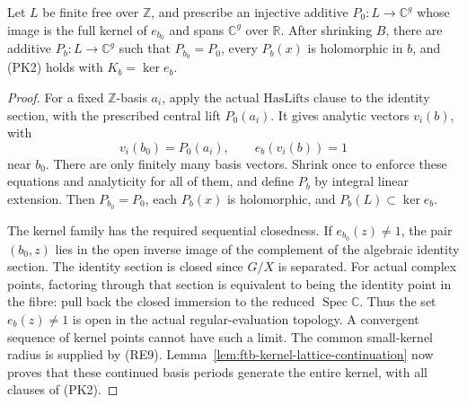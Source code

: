 \begin{srproposition}
\label{prop:ftb-holomorphic-full-period-kernel}
Let \(L\) be finite free over \(\mathbb Z\), and prescribe
an injective additive \(P_0:L\to\mathbb C^g\) whose image
is the full kernel of \(e_{b_0}\) and spans \(\mathbb C^g\)
over \(\mathbb R\).
After shrinking \(B\), there are additive \(P_b:L\to\mathbb C^g\)
such that \(P_{b_0}=P_0\), every \(P_b(x)\) is holomorphic
in \(b\), and (PK2) holds with \(K_b=\ker e_b\).
\end{srproposition}
\begin{proof}
For a fixed \(\mathbb Z\)-basis \(a_i\), apply the actual
\(\mathrm{HasLifts}\) clause to the identity section, with
the prescribed central lift \(P_0(a_i)\).
It gives analytic vectors \(v_i(b)\), with
\[
              v_i(b_0)=P_0(a_i),\qquad e_b(v_i(b))=1
\]
near \(b_0\).
There are only finitely many basis vectors.
Shrink once to enforce these equations and analyticity
for all of them, and define \(P_b\) by integral linear
extension.
Then \(P_{b_0}=P_0\), each \(P_b(x)\) is holomorphic, and
\(P_b(L)\subset\ker e_b\).

The kernel family has the required sequential closedness.
If \(e_{b_0}(z)\ne1\), the pair \((b_0,z)\) lies in the
open inverse image of the complement of the algebraic
identity section.
The identity section is closed since \(G/X\) is separated.
For actual complex points, factoring through that section
is equivalent to being the identity point in the fibre:
pull back the closed immersion to the reduced
\(\operatorname{Spec}\mathbb C\).
Thus the set \(e_b(z)\ne1\) is open in the actual
regular-evaluation topology.
A convergent sequence of kernel points cannot have such
a limit.
The common small-kernel radius is supplied by (RE9).
Lemma~\ref{lem:ftb-kernel-lattice-continuation} now proves
that these continued basis periods generate the entire
kernel, with all clauses of (PK2).
\end{proof}

